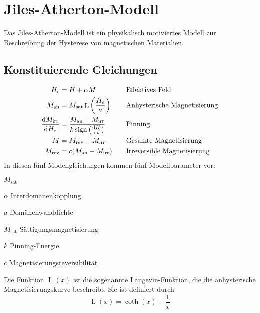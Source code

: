 \documentclass{scrartcl}
\DeclareMathOperator{\sign}{sign}
\DeclareMathOperator{\Langevin}{L}
\newcommand{\He}{H_\text{e}}
\newcommand{\Man}{M_\text{an}}
\newcommand{\Msat}{M_\text{sat}}
\newcommand{\Mirr}{M_\text{irr}}
\newcommand{\Mrev}{M_\text{rev}}
\begin{document}
\section{Jiles-Atherton-Modell}
\label{sec:jiles-atherton}
Das Jiles-Atherton-Modell ist ein physikalisch motiviertes Modell zur Beschreibung der Hysterese von magnetischen Materialien.
\subsection{Konstituierende Gleichungen}
\begin{align}
	\He &= H + \alpha M \quad &&\text{Effektives Feld} \label{eq:h_eff}\\
	\Man &= \Msat \Langevin\left(\frac{\He}{a}\right) \quad &&\text{Anhysterische Magnetisierung}  \label{eq:m_an}\\
	\frac{\dif\Mirr}{\dif \He} &= \frac{\Man - \Mirr}{k \sign\left(\frac{\dif H}{\dif t}\right)} \quad &&\text{Pinning} \label{eq:pinning}\\
	M &= \Mrev + \Mirr \quad &&\text{Gesamte Magnetisierung} \label{eq:m_gesamt}\\
	\Mrev &= c(\Man - \Mirr) \quad &&\text{Irreversible Magnetisierung} \label{eq:m_rev}
\end{align}
In diesen fünf Modellgleichungen kommen fünf Modellparameter vor:
\begin{labeling}{$\Msat$}
	\item[$\alpha$]{Interdomänenkopplung}
	\item[$a$]{Domänenwanddichte}
	\item[$\Msat$]{Sättigungsmagnetisierung}
	\item[$k$]{Pinning-Energie}
	\item[$c$]{Magnetisierungsreversibilität}
\end{labeling}
Die Funktion $\Langevin(x)$ ist die sogenannte Langevin-Funktion, die die anhysterische Magnetisierungskurve beschreibt. Sie ist definiert durch
\begin{equation}
	\Langevin(x) = \coth(x) - \frac{1}{x}
\end{equation}
\end{document}
